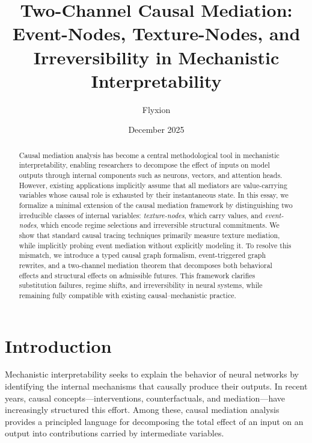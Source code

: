 \documentclass[11pt]{article}
\title{Two-Channel Causal Mediation:\\
Event-Nodes, Texture-Nodes, and Irreversibility in Mechanistic Interpretability}
\author{Flyxion}
\date{December 2025}
\theoremstyle{remark}
\begin{document}
\maketitle

\begin{abstract}
Causal mediation analysis has become a central methodological tool in mechanistic interpretability, enabling researchers to decompose the effect of inputs on model outputs through internal components such as neurons, vectors, and attention heads. However, existing applications implicitly assume that all mediators are value-carrying variables whose causal role is exhausted by their instantaneous state. In this essay, we formalize a minimal extension of the causal mediation framework by distinguishing two irreducible classes of internal variables: \emph{texture-nodes}, which carry values, and \emph{event-nodes}, which encode regime selections and irreversible structural commitments. We show that standard causal tracing techniques primarily measure texture mediation, while implicitly probing event mediation without explicitly modeling it. To resolve this mismatch, we introduce a typed causal graph formalism, event-triggered graph rewrites, and a two-channel mediation theorem that decomposes both behavioral effects and structural effects on admissible futures. This framework clarifies substitution failures, regime shifts, and irreversibility in neural systems, while remaining fully compatible with existing causal–mechanistic practice.
\end{abstract}

\tableofcontents

\section{Introduction}

Mechanistic interpretability seeks to explain the behavior of neural networks by identifying the internal mechanisms that causally produce their outputs. In recent years, causal concepts—interventions, counterfactuals, and mediation—have increasingly structured this effort. Among these, causal mediation analysis provides a principled language for decomposing the total effect of an input on an output into contributions carried by intermediate variables.
\end{document}
